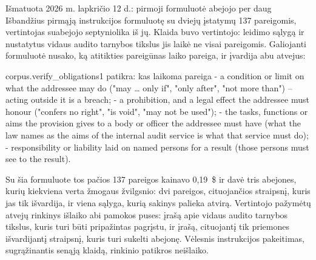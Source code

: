 \begin{lessonbox}{Išmatuota 2026 m. lapkričio 12 d.: pirmoji formuluotė abejojo per daug}
Išbandžius pirmąją instrukcijos formuluotę su dviejų įstatymų 137 pareigomis, vertintojas
suabejojo septyniolika iš jų. Klaida buvo vertintojo: leidimo sąlygą ir nustatytus vidaus
audito tarnybos tikslus jis laikė ne visai pareigomis. Galiojanti formuluotė nusako, ką atitikties
pareigūnas laiko pareiga, ir įvardija abu atvejus:

\begin{promptexcerpt}{corpus.verify_obligations}{1 patikra: kas laikoma pareiga}
   - a condition or limit on what the addressee may do ("may … only if", "only after", "not more than") – acting outside it is a breach;
   - a prohibition, and a legal effect the addressee must honour ("confers no right", "is void", "may not be used");
   - the tasks, functions or aims the provision gives to a body or officer the addressee must have (what the law names as the aims of the internal audit service is what that service must do);
   - responsibility or liability laid on named persons for a result (those persons must see to the result).
\end{promptexcerpt}

Su šia formuluote tos pačios 137 pareigos kainavo 0,19~\$ ir davė tris abejones, kurių kiekviena
verta žmogaus žvilgsnio: dvi pareigos, cituojančios straipsnį, kuris jas tik išvardija, ir viena
sąlyga, kurią sakinys palieka atvirą. Vertintojo pažymėtų atvejų rinkinys išlaiko abi pamokos
puses: įrašą apie vidaus audito tarnybos tikslus, kuris turi būti pripažintas pagrįstu, ir įrašą,
cituojantį tik priemones išvardijantį straipsnį, kuris turi sukelti abejonę. Vėlesnis
instrukcijos pakeitimas, sugrąžinantis senąją klaidą, rinkinio patikros neišlaiko.
\end{lessonbox}

